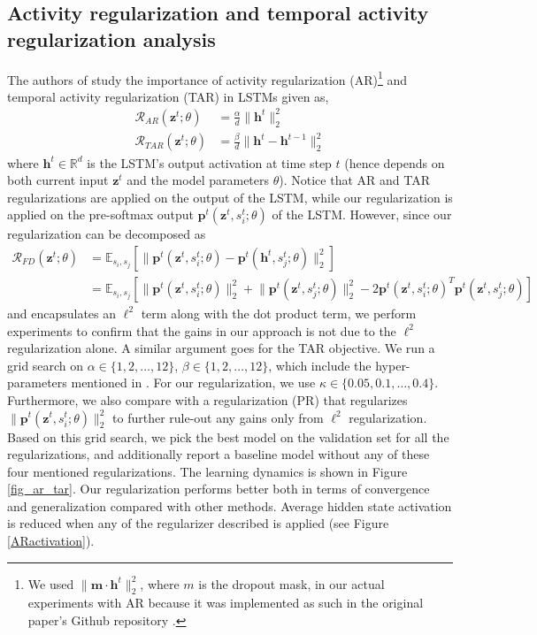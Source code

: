 \documentclass{article} \usepackage{iclr2018_conference,times}
\begin{document}
\subsection{Activity regularization and temporal activity regularization analysis} \label{subsec:ar_tar}
The authors of \cite{ar_tar} study the importance of activity regularization (AR)\footnote{We used $\lVert\mathbf{m \cdot h}^t\rVert_2^2$, where $m$ is the dropout mask, in our actual experiments with AR because it was implemented as such in the original paper's Github repository \cite{merity2017regularizing}.} and temporal activity regularization (TAR) in LSTMs given as,
\begin{align}
\mathcal{R}_{AR}(\mathbf{z}^{t}; \theta) &= \frac{\alpha}{d} \lVert \mathbf{h}^t \rVert_2^2\\
\mathcal{R}_{TAR}(\mathbf{z}^{t}; \theta) &= \frac{\beta}{d} \lVert \mathbf{h}^t - \mathbf{h}^{t-1} \rVert_2^2
\end{align}
where $\mathbf{h}^t \in \mathbb{R}^d$ is the LSTM's output activation at time step $t$ (hence depends on both current input $\mathbf{z}^{t}$ and the model parameters $\theta$). Notice that AR and TAR regularizations are applied on the output of the LSTM, while our regularization is applied on the pre-softmax output $\mathbf{p}^t(\mathbf{z}^{t}, s_i^t; \theta)$ of the LSTM. However, since our regularization can be decomposed as
\begin{align}
\mathcal{R}_{FD}(\mathbf{z}^{t}; \theta) &= \mathbb{E}_{s_i, s_j} \left[ \lVert \mathbf{p}^t(\mathbf{z}^{t}, s_i^t; \theta) - \mathbf{p}^t(\mathbf{h}^{t}, s_j^t; \theta) \rVert^2_2 \right]\\
&= \mathbb{E}_{s_i, s_j} \left[ \lVert \mathbf{p}^t(\mathbf{z}^{t}, s_i^t; \theta) \rVert^2_2  + \lVert \mathbf{p}^t(\mathbf{z}^{t}, s_j^t; \theta) \rVert^2_2 - 2 \mathbf{p}^t(\mathbf{z}^{t}, s_i^t; \theta)^T \mathbf{p}^t(\mathbf{z}^{t}, s_j^t; \theta)  \right]
\end{align}
and encapsulates an $\ell^2$ term along with the dot product term, we perform experiments to confirm that the gains in our approach is not due to the $\ell^2$ regularization alone. A similar argument goes for the TAR objective. We run a grid search on $\alpha \in \{ 1,2, \hdots,12 \}$, $\beta \in \{ 1,2, \hdots,12  \}$, which include the hyper-parameters mentioned in \cite{merity2017regularizing}. For our regularization, we use $\kappa \in \{ 0.05,0.1,\hdots,0.4 \}$. Furthermore, we also compare with a regularization (PR) that regularizes $\lVert \mathbf{p}^t(\mathbf{z}^{t}, s_i^t; \theta) \rVert_2^2$ to further rule-out any gains only from $\ell^2$ regularization. Based on this grid search, we pick the best model on the validation set for all the regularizations, and additionally report a baseline model without any of these four mentioned regularizations. The learning dynamics is shown in Figure \ref{fig_ar_tar}. Our regularization performs better both in terms of convergence and generalization compared with other methods. Average hidden state activation is reduced when any of the regularizer described is applied (see Figure \ref{ARactivation}).
\end{document}
